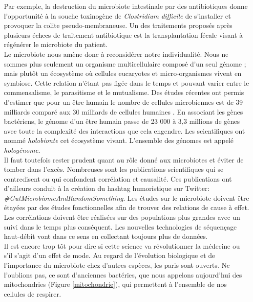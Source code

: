 \documentclass[12pt,a4paper]{article}
\begin{document}
Par exemple, la destruction du microbiote intestinale par des antibiotiques donne l'opportunité à la souche toxinogène de \textit{Clostridium difficile} de s'installer et provoquer la colite pseudo-membraneuse. Un des traitements proposés après plusieurs échecs de traitement antibiotique est la transplantation fécale visant à régénérer le microbiote du patient. \\
Le microbiote nous amène donc à reconsidérer notre individualité. Nous ne sommes plus seulement un organisme multicellulaire composé d'un seul génome ; mais plutôt un écosystème où cellules eucaryotes et micro-organismes vivent en symbiose. Cette relation n'étant pas figée dans le temps et pouvant varier entre le commensalisme, le parasitisme et le mutualisme. Des études récentes ont permis d'estimer que pour un être humain le nombre de cellules microbiennes est de 39 milliards comparé aux 30 milliards de cellules humaines \cite{Sender2016}. En associant les gènes bactériens, le génome d’un être humain passe de 23 000  à 3,3 millions de gènes \cite{Qin2010} avec toute la complexité des interactions que cela engendre. Les scientifiques ont nommé \textit{holobionte} cet écosystème vivant. L'ensemble des génomes est appelé \textit{hologénome}. \\
Il faut toutefois rester prudent quant au rôle donné aux microbiotes et éviter de tomber dans l'excès. Nombreuses sont les publications scientifiques qui se contredisent ou qui confondent corrélation et causalité. Ces publications ont d'ailleurs conduit à la création du hashtag humoristique sur Twitter: \textit{\#GutMicrobiomeAndRandomSomething}.
Les études sur le microbiote doivent être étayées par des études fonctionnelles afin de trouver des relations de cause à effet. Les corrélations doivent être réalisées sur des populations plus grandes avec un suivi dans le temps plus conséquent. Les nouvelles technologies de séquençage haut-débit vont dans ce sens en collectant toujours plus de données.\\
Il est encore trop tôt pour dire si cette science va révolutionner la médecine ou s’il s'agit d'un effet de mode. Au regard de l'évolution biologique et de l'importance du microbiote chez d'autres espèces, les paris sont ouverts. Ne l'oublions pas, ce sont d'anciennes bactéries, que nous appelons aujourd'hui des mitochondries (Figure \ref{mitochondrie}), qui permettent à l'ensemble de nos cellules de respirer.
\end{document}

